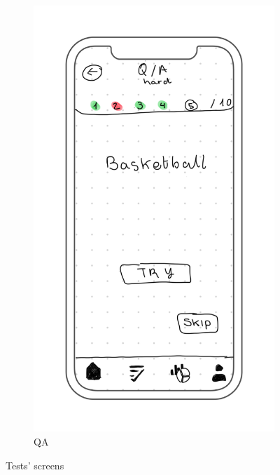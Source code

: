 \begin{figure}[H]
\begin{subfigure}[T]{0.24\textwidth}
        \includegraphics[width=\textwidth]{assets/screens/quiz/Quiz - Q_A.png}
        \caption{QA}
        \label{fig:design_screen_mimic}
    \end{subfigure}
       \caption{Tests' screens}
       \label{fig:design_test_screen}
\end{figure}

